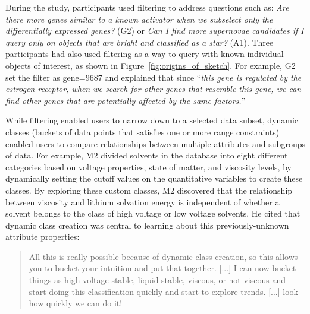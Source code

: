  During the study, participants used filtering
 to address questions such as:
 \textit{Are there more genes similar
 to a known activator when we subselect
 only the differentially expressed genes?} (G2) or \textit{Can I find more supernovae candidates if I query only on objects that are bright and classified as a star?} (A1). Three participants had also used filtering as a way to query with known individual objects of interest, as shown in Figure~\ref{fig:origins_of_sketch}. For example, G2 set the filter as gene=9687 and explained that since ``\textit{this gene is regulated by the estrogen receptor, when we search for other genes that resemble this gene, we can find other genes that are potentially affected by the same factors.}''
 \par While filtering enabled users to
 narrow down to a selected data subset,
 dynamic classes (buckets of data points that satisfies one or more range constraints) enabled users to compare
 relationships between multiple attributes and subgroups of data.
 For example, M2 divided solvents in the database
 into eight different categories based on voltage properties,
 state of matter, and viscosity levels,
 by dynamically setting the cutoff values
 on the quantitative variables to create these classes.
 By exploring these custom classes, M2 discovered that the relationship between viscosity and lithium solvation energy is independent of whether a solvent belongs to the class of high voltage or low voltage solvents. He cited that dynamic class creation was central to learning about this previously-unknown attribute properties:
 \begin{quote}
 All this is really possible because of dynamic class creation, so this allows you to bucket your intuition and put that together. [...] I can now bucket things as high voltage stable, liquid stable, viscous, or not viscous and start doing this classification quickly and start to explore trends. [...] look how quickly we can do it!%
 \end{quote}
